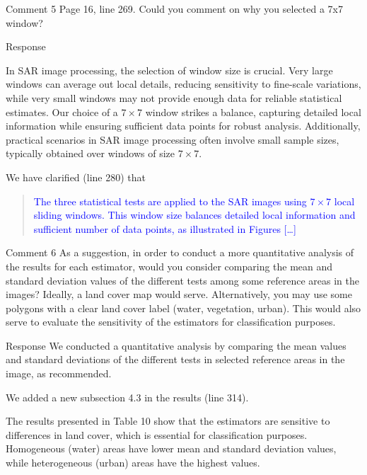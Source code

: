 \documentclass[11pt]{report}
\begin{document}
\vspace{3em}
\begin{reviewbox}{Comment 5}
Page 16, line 269. Could you comment on why you selected a 7x7 window?
\end{reviewbox}
\begin{responsebox}{Response}

In SAR image processing, the selection of window size is crucial. Very large windows can average out local details, reducing sensitivity to fine-scale variations, while very small windows may not provide enough data for reliable statistical estimates. Our choice of a $7\times 7$ window strikes a balance, capturing detailed local information while ensuring sufficient data points for robust analysis. Additionally, practical scenarios in SAR image processing often involve small sample sizes, typically obtained over windows of size $7\times 7$. 

We have clarified (line 280) that
\begin{quote}
	\textcolor{blue}{The three statistical tests are applied to the SAR images using $7\times 7$ local sliding windows.
		This window size balances detailed local information and sufficient number of data points, as illustrated in Figures [\dots]}
\end{quote}
\end{responsebox}

\vspace{3em}
\begin{reviewbox}{Comment 6}
As a suggestion, in order to conduct a more quantitative analysis of the results for each estimator, would you consider comparing the mean and standard deviation values of the different tests among some reference areas in the images? Ideally, a land cover map would serve. Alternatively, you may use some polygons with a clear land cover label (water, vegetation, urban). This would also serve to evaluate the sensitivity of the estimators for classification purposes.
\end{reviewbox}
\begin{responsebox}{Response}
We conducted a quantitative analysis by comparing the mean values and standard deviations of the different tests in selected reference areas in the image, as recommended.

We added a new subsection 4.3 in the results (line 314). 

The results presented in Table 10 show that the estimators are sensitive to differences in land cover, which is essential for classification purposes. Homogeneous (water) areas have lower mean and standard deviation values, while heterogeneous (urban) areas have the highest values.
	
	

\end{responsebox}
\end{document}
